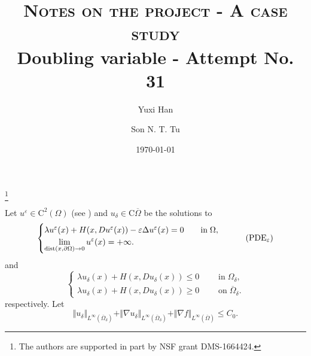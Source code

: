 \documentclass[11pt,reqno]{amsart}
\numberwithin{figure}{section}
\theoremstyle{plain}
\theoremstyle{remark}
\numberwithin{equation}{section}
\begin{document}
\title[Rate of convergence]
{\textsc{Notes on the project - A case study}\\ {\small Doubling variable - Attempt No. 31}}
\thanks{The authors are supported in part by NSF grant DMS-1664424.}
\author{Yuxi Han}
\address[Y. Han]
{
Department of Mathematics, 
University of Wisconsin Madison, 480 Lincoln  Drive, Madison, WI 53706, USA}
\author{Son N. T. Tu}
\address[S. N.T. Tu]
{
Department of Mathematics, 
University of Wisconsin Madison, 480 Lincoln  Drive, Madison, WI 53706, USA}
\date{\today}
\maketitle
\setcounter{tocdepth}{1}



\noindent Let $u^\varepsilon\in \mathrm{C}^2(\Omega)$ (see \cite{Lasry1989}) and $u_\delta\in \mathrm{C}{\overline{\Omega}}$ be the solutions to 
\begin{equation}\label{eq:PDEeps}
    \begin{cases}
    \lambda u^\varepsilon(x) + H(x,Du^\varepsilon(x)) - \varepsilon \Delta u^\varepsilon(x) = 0 \qquad
    \text{in}\;\Omega, \vspace{0cm}\\
    \displaystyle  \lim_{\mathrm{dist}(x,\partial \Omega)\to 0} u^\varepsilon(x) = +\infty.
    \end{cases} \tag{PDE$_\varepsilon$}
\end{equation}
and
\begin{equation}\label{eq:PDE0}
    \begin{cases}
     \lambda u_\delta(x) + H(x,Du_\delta(x)) \leq 0\;\qquad\text{in}\;\Omega_\delta,\\
     \lambda u_\delta(x) + H(x,Du_\delta(x)) \geq 0\;\qquad\text{on}\;\overline{\Omega}_\delta.
    \end{cases} \tag{PDE$_\delta$}
\end{equation}
respectively. Let
\begin{equation*}
    \Vert u_\delta\Vert_{L^\infty(\overline{\Omega}_\delta)} + \Vert \nabla u_\delta\Vert_{L^\infty(\overline{\Omega}_\delta)} + \Vert \nabla f\Vert_{L^\infty(\overline{\Omega})} \leq C_0.
\end{equation*}
\end{document}
